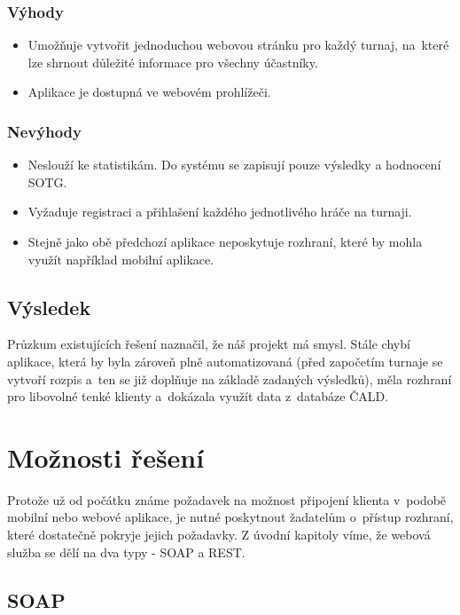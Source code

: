 \subsubsection*{Výhody}
\begin{itemize}
  \item Umožňuje vytvořit jednoduchou webovou stránku pro každý turnaj, na~které lze shrnout důležité informace pro všechny účastníky.
  \item Aplikace je dostupná ve webovém prohlížeči.
\end{itemize}

\subsubsection*{Nevýhody}
\begin{itemize}
  \item Neslouží ke statistikám. Do systému se zapisují pouze výsledky a hodnocení SOTG.
  \item Vyžaduje registraci a přihlašení každého jednotlivého hráče na turnaji.
  \item Stejně jako obě předchozí aplikace neposkytuje rozhraní, které by mohla využít například mobilní aplikace.
\end{itemize}

\subsection{Výsledek}

Průzkum existujících řešení naznačil, že náš projekt má smysl. Stále chybí aplikace,
která by byla zároveň plně automatizovaná (před započetím turnaje se vytvoří rozpis a~ten se
již doplňuje na základě zadaných výsledků), měla rozhraní pro libovolné tenké klienty
a~dokázala využít data z~databáze ČALD.

\section{Možnosti řešení}

Protože už od počátku známe požadavek na možnost připojení klienta v~podobě mobilní nebo webové aplikace,
je nutné poskytnout žadatelům o~přístup rozhraní, které dostatečně pokryje jejich požadavky.
Z úvodní kapitoly víme, že webová služba se dělí na dva typy - SOAP a REST.

\subsection{SOAP}

